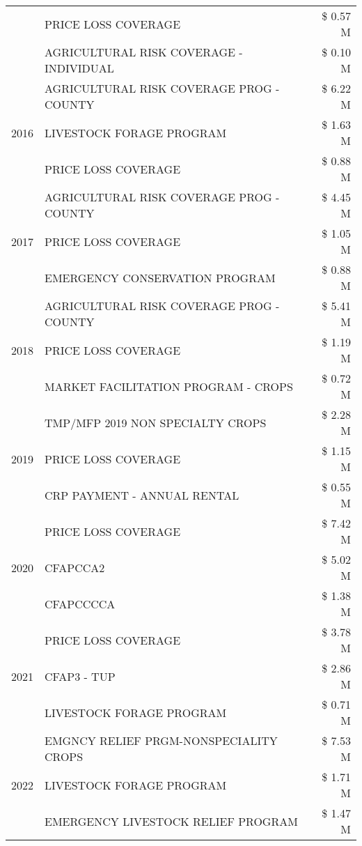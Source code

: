 \begin{tabular}{llr}
 & PRICE LOSS COVERAGE & \$ 0.57 M \\
 & AGRICULTURAL RISK COVERAGE - INDIVIDUAL & \$ 0.10 M \\
\cline{1-3}
\multirow[t]{3}{*}{2016} & AGRICULTURAL RISK COVERAGE PROG - COUNTY & \$ 6.22 M \\
 & LIVESTOCK FORAGE PROGRAM & \$ 1.63 M \\
 & PRICE LOSS COVERAGE & \$ 0.88 M \\
\cline{1-3}
\multirow[t]{3}{*}{2017} & AGRICULTURAL RISK COVERAGE PROG - COUNTY & \$ 4.45 M \\
 & PRICE LOSS COVERAGE & \$ 1.05 M \\
 & EMERGENCY CONSERVATION PROGRAM & \$ 0.88 M \\
\cline{1-3}
\multirow[t]{3}{*}{2018} & AGRICULTURAL RISK COVERAGE PROG - COUNTY & \$ 5.41 M \\
 & PRICE LOSS COVERAGE & \$ 1.19 M \\
 & MARKET FACILITATION PROGRAM - CROPS & \$ 0.72 M \\
\cline{1-3}
\multirow[t]{3}{*}{2019} & TMP/MFP 2019 NON SPECIALTY CROPS & \$ 2.28 M \\
 & PRICE LOSS COVERAGE & \$ 1.15 M \\
 & CRP PAYMENT - ANNUAL RENTAL & \$ 0.55 M \\
\cline{1-3}
\multirow[t]{3}{*}{2020} & PRICE LOSS COVERAGE & \$ 7.42 M \\
 & CFAPCCA2 & \$ 5.02 M \\
 & CFAPCCCCA & \$ 1.38 M \\
\cline{1-3}
\multirow[t]{3}{*}{2021} & PRICE LOSS COVERAGE & \$ 3.78 M \\
 & CFAP3 - TUP & \$ 2.86 M \\
 & LIVESTOCK FORAGE PROGRAM & \$ 0.71 M \\
\cline{1-3}
\multirow[t]{3}{*}{2022} & EMGNCY RELIEF PRGM-NONSPECIALITY CROPS & \$ 7.53 M \\
 & LIVESTOCK FORAGE PROGRAM & \$ 1.71 M \\
 & EMERGENCY LIVESTOCK RELIEF PROGRAM & \$ 1.47 M \\
\cline{1-3}
\bottomrule
\end{tabular}
